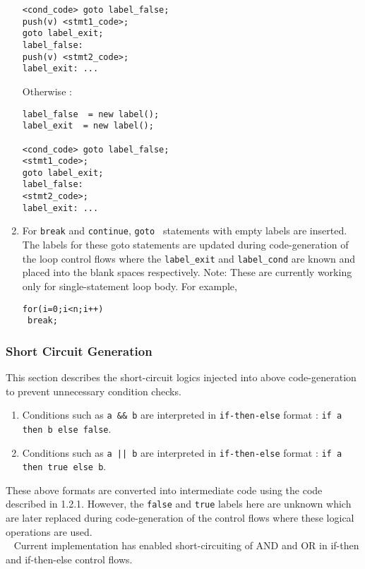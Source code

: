 \documentclass[12pt]{article}
\begin{document}
\begin{enumerate}
\begin{verbatim}
<cond_code> goto label_false;
push(v) <stmt1_code>;
goto label_exit;
label_false:
push(v) <stmt2_code>;
label_exit: ...
\end{verbatim}

Otherwise :  
\begin{verbatim}
label_false  = new label();
label_exit  = new label();

<cond_code> goto label_false;
<stmt1_code>;
goto label_exit;
label_false:
<stmt2_code>;
label_exit: ...
\end{verbatim}

\item For \texttt{break} and \texttt{continue},  \texttt{goto } statements with empty labels are inserted.
The labels for these goto statements are updated during code-generation of the loop control flows where the \texttt{label\_exit} and \texttt{label\_cond} are known and placed into the blank spaces respectively.
Note: These are currently working only for single-statement loop body. For example,
\begin{verbatim}
for(i=0;i<n;i++)
 break;
\end{verbatim}
\end{enumerate}

\subsubsection{Short Circuit Generation}
This section describes the short-circuit logics injected into above code-generation to prevent unnecessary condition checks.

\begin{enumerate}
\item Conditions such as \texttt{a \&\& b} are interpreted in \texttt{if-then-else} format  :
\texttt{if a then b else false}.
\item Conditions such as \texttt{a || b} are interpreted in \texttt{if-then-else} format  :
\texttt{if a then true else b}.
\end{enumerate}

These above formats are converted into intermediate code using the code described in 1.2.1. However, the \texttt{false} and \texttt{true} labels here are unknown which are later replaced during code-generation of the control flows where these logical operations are used.
\\~
Current implementation has enabled short-circuiting of AND and OR in if-then and if-then-else control flows.
\end{document}
